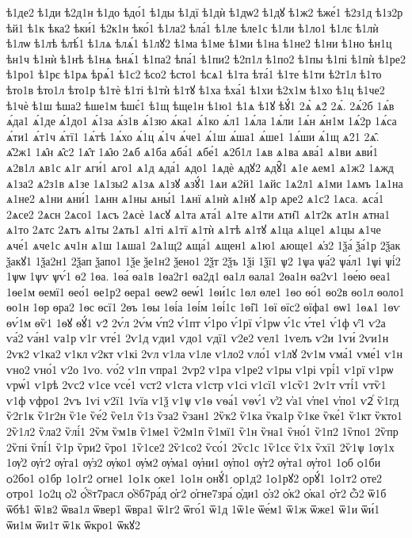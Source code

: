 {ѣ1де2
ѣ1ди
ѣ2д1н
ѣ1до
ѣдо́1
ѣ1ды
ѣ1дї
ѣ1дѝ
ѣ1дѡ2
ѣ1дꙋ
ѣ1ж2
ѣже́1
ѣ2з1д
ѣ1з2р
ѣй1
ѣ1к
ѣка2
ѣки́1
ѣ2к1н
ѣко́1
ѣ1ла2
ѣла́1
ѣ1ле
ѣле1с
ѣ1ли
ѣ1ло1
ѣ1лє
ѣ1лѝ
ѣ1лѡ
ѣ1лѣ
ѣлѣ́1
ѣ1лѧ
ѣлѧ́1
ѣ1лꙋ2
ѣ1ма
ѣ1ме
ѣ1ми
ѣ1на
ѣ1не2
ѣ1ни
ѣ1но
ѣн1ц
ѣн1ч
ѣ1нѝ
ѣ1нѣ
ѣ1нѧ
ѣнѧ́1
ѣ1па2
ѣпа́1
ѣ1пи2
ѣ2п1л
ѣ1по2
ѣ1пы
ѣ1пі
ѣ1пѝ
ѣ1ре2
ѣ1ро1
ѣ1рє
ѣ1рѧ
ѣрѧ́1
ѣ1с2
ѣсо2
ѣсто1
ѣсѧ1
ѣ1та
ѣта́1
ѣ1те
ѣ1ти
ѣ2т1л
ѣ1то
ѣто1в
ѣто1л
ѣто1р
ѣ1тѐ
ѣ1ті
ѣ1тѝ
ѣ1тꙋ
ѣ1ха
ѣха́1
ѣ1хи
ѣ2х1м
ѣ1хо
ѣ1ц
ѣ1че2
ѣ1чѐ
ѣ1ш
ѣша2
ѣше1м
ѣшє́1
ѣ1щ
ѣще1н
ѣ1ю1
ѣ1ѧ
ѣ1ꙋ
ѣꙋ́1
2ѧ̀
ѧ2́
2ѧ́.
2ѧ́2б
1ѧ́в
ѧ́да1
ѧ́1де
ѧ́1до1
ѧ́1за
ѧ́з1в
ѧ́1зю
ѧ́ка1
ѧ́1ко
ѧ́л1
1ѧ́ла
1ѧ́ли
1ѧ́н
ѧ́н1м
1ѧ́2р
1ѧ́са
ѧ́ти1
ѧ́т1ч
ѧ́тї1
1ѧ́тѣ
1ѧ́хо
ѧ́1ц
ѧ́1ч
ѧ́че1
ѧ́1ш
ѧ́ша1
ѧ́ше1
1ѧ́ши
ѧ́1щ
ѧ2̑1
2ѧ̑.
ѧ̑2ж1
1ѧ̑н
ѧ̑с2
1ѧ̑т
1ѧ̑ю
2ѧб
ѧ1ба
ѧба́1
ѧбе́1
ѧ2б1л
1ѧв
ѧ1ва
ѧва́1
ѧ1ви
ѧви́1
ѧ2в1л
ѧв1с
ѧ1г
ѧги́1
ѧго1
ѧ1д
ѧда́1
ѧдо1
1ѧдѐ
ѧдꙋ2
ѧдꙋ̑1
ѧ1е
ѧем1
ѧ1ж2
1ѧжд
ѧ1за2
ѧ2з1в
ѧ1зе
1ѧ1зы2
ѧ1зѧ
ѧ1зꙋ
ѧзꙋ́1
1ѧи
ѧ2й1
1ѧйс
1ѧ2л1
ѧ1ми
1ѧмъ
1ѧ1на
ѧ1не2
ѧ1ни
ѧни́1
1ѧнн
ѧ1ны
ѧны́1
1ѧнї
ѧ1нѝ
ѧ1нꙋ
ѧ1р
ѧре2
ѧ1с2
1ѧса.
ѧса́1
2ѧсе2
2ѧсн
2ѧсо1
1ѧсъ
2ѧсѐ
1ѧсꙋ
ѧ1та
ѧта́1
ѧ1те
ѧ1ти
ѧти̑1
ѧ1т2к
ѧт1н
ѧтна1
ѧ1то
2ѧтс
2ѧтъ
ѧ1ты
2ѧть1
ѧ1ті
ѧ1тї
ѧ1тѝ
ѧ1тѣ
ѧ1тꙋ
ѧ1ца
ѧ1це1
ѧ1цы
ѧ1че
ѧче́1
ѧче1с
ѧч1н
ѧ1ш
1ѧша1
2ѧ1щ2
ѧща́1
ѧщен1
ѧ1ю1
ѧюще1
ѧ҆з2
1ѯа́
ѯа́1р
2ѯак
ѯакꙋ1
1ѯа2н1
2ѯап
ѯапо1
1ѯе
ѯе1н2
ѯено1
2ѯт
2ѯъ
1ѯі
1ѯї1
ѱ2
1ѱа
ѱа́2
ѱа́л1
1ѱі
ѱі́2
1ѱѡ
1ѱѵ
ѱѵ́1
ѳ2
1ѳа.
1ѳа́
ѳа1в
1ѳа2г1
ѳа2д1
ѳа1л
ѳала1
2ѳа1н
ѳа2ѵ1
1ѳе́ю
ѳеа1
1ѳе1м
ѳемї1
ѳео́1
ѳе1р2
ѳера1
ѳеѡ2
ѳеѡ́1
1ѳи́1с
1ѳл
ѳле1
1ѳо
ѳо́1
ѳо2в
ѳо1л
ѳоло1
ѳо1н
1ѳр
ѳра2
1ѳс
ѳсї1
2ѳъ
1ѳы
1ѳі́а
1ѳі́м
1ѳі́1с
1ѳі̑1
1ѳї
ѳїс2
ѳїфа1
ѳѡ1
1ѳѧ1
1ѳѵ
ѳѵ́1м
ѳѷ1
1ѳꙋ
ѳꙋ́1
ѵ2́
2ѵ́л
2ѵ́м
ѵ́п2
ѵ́1пт
ѵ́1ро
ѵ́1рї
ѵ́1рѡ
ѵ́1с
ѵ́те1
ѵ́1ф
ѵ̑1
ѵ2а
ѵа́2
ѵа́н1
ѵа1р
ѵ1г
ѵге́1
2ѵ1д
ѵди1
ѵдо1
ѵдї1
ѵ2е2
ѵел1
1ѵелъ
ѵ2и
1ѵи́
2ѵи1н
2ѵк2
ѵ1ка2
ѵ1кл
ѵ2кт
ѵ1кі
2ѵл
ѵ1ла
ѵ1ле
ѵ1ло2
ѵло́1
ѵ1лꙋ
2ѵ1м
ѵма́1
ѵме́1
ѵ1н
ѵно2
ѵно́1
ѵ2о
1ѵо.
ѵо́2
ѵ1п
ѵпра1
2ѵр2
ѵ1ра
ѵ1ре2
ѵ1ры
ѵ1рі
ѵрі́1
ѵ1рї
ѵ1рѡ
ѵрѡ́1
ѵ1рѣ
2ѵс2
ѵ1се
ѵсе́1
ѵст2
ѵ1ста
ѵ1стр
ѵ1сі
ѵ1сї1
ѵ1сѷ1
2ѵ1т
ѵті́1
ѵтѷ1
ѵ1ф
ѵфро1
2ѵъ
1ѵі
ѵ2ї1
1ѵїа
ѵ1ѯ
ѵ1ѱ
ѵ1ѳ
ѵѳа́1
ѵѳѵ́1
ѵ҆2
ѵ҆а1
ѵ҆пе1
ѵ҆по1
ѵ2ⷢ
ѷ1гд
ѷ2г1к
ѷ1г2н
ѷ1е
ѷе́2
ѷе1л
ѷ1з
ѷза2
ѷзан1
2ѷк2
ѷ1ка
ѷка1р
ѷ1ке
ѷке́1
ѷ1кт
ѷкто1
2ѷ1л2
ѷла2
ѷлі́1
2ѷм
ѷм1в
ѷ1ме1
ѷ2м1п
ѷ1мї1
ѷ1н
ѷна1
ѷно́1
ѷ1п2
1ѷпо1
2ѷпр
2ѷпі
ѷпі́1
ѷ1р
ѷри2
ѷро1
1ѷ1се2
2ѷ1со2
ѷсо́1
2ѷс1с
1ѷ1сє
ѷ1х
ѷхї1
2ѷ1ѱ
1ѹ1х
1ѹ҆2
ѹ҆г2
ѹ҆га1
ѹ҆з2
ѹ҆ко1
ѹ҆м2
ѹ҆ма1
ѹ҆ни1
ѹ҆по1
ѹ҆т2
ѹ҆та1
ѹ҆то1
1ѻб
ѻ1би
ѻ2бо1
ѻ1бр
1ѻ1г2
ѻгне1
1ѻ1к
ѻке1
1ѻ1н
ѻнꙋ́1
ѻр1д2
1ѻ1рꙋ2
ѻрꙋ́1
1ѻ1т2
ѻте2
ѻтро1
1ѻ2ц
ѻ҆2
ѻ҆́8т7расл
ѻ҆8б7ра́д
ѻ҆г2
ѻ҆гне7зра́
ѻ҆ди1
ѻ҆з2
ѻ҆к2
ѻ҆ка1
ѻ҆т2
ѽ2
ѿ1б
ѿбѣ1
ѿ1в2
ѿва1л
ѿвер1
ѿвра1
ѿ1г2
ѿго́1
ѿ1д
1ѿ1е
ѿе́м1
ѿ1ж
ѿже1
ѿ1и
ѿи́1
ѿи1м
ѿи1т
ѿ1к
ѿкро1
ѿкꙋ2
}
